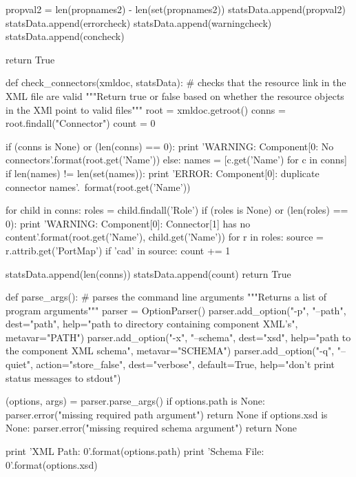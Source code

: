 \begin{MyVerbatim}
    propval2 = len(propnames2) - len(set(propnames2))
    statsData.append(propval2)
    statsData.append(errorcheck)
    statsData.append(warningcheck)
    statsData.append(concheck)

    return True


def check_connectors(xmldoc, statsData):  # checks that the resource link 
 in the XML file are valid
    """Return true or false based on whether the resource objects in the 
       XMl point to valid files"""
    root = xmldoc.getroot()
    conns = root.findall("Connector")
    count = 0

    if (conns is None) or (len(conns) == 0):
        print 'WARNING: Component[{0}: No 
         connectors'.format(root.get('Name'))
    else:
        names = [c.get('Name') for c in conns]
        if len(names) != len(set(names)):
            print 'ERROR: Component[{0}]: duplicate connector names'.\
                format(root.get('Name'))

        for child in conns:
            roles = child.findall('Role')
            if (roles is None) or (len(roles) == 0):
                print 'WARNING: Component[{0}]: Connector[{1}] has no 
                 content'.format(root.get('Name'), child.get('Name'))
            for r in roles:
                source = r.attrib.get('PortMap')
                if 'cad' in source:
                    count += 1
            
    statsData.append(len(conns))
    statsData.append(count)
    return True


def parse_args():    # parses the command line arguments
    """Returns a list of program arguments"""
    parser = OptionParser()
    parser.add_option("-p", "--path", dest="path",
                  help="path to directory containing component XML's", 
                   metavar="PATH")
    parser.add_option("-x", "--schema", dest="xsd",
                  help="path to the component XML schema", metavar="SCHEMA")
    parser.add_option("-q", "--quiet",
                  action="store_false", dest="verbose", default=True,
                  help="don't print status messages to stdout")

    (options, args) = parser.parse_args()
    if options.path is None:
        parser.error("missing required path argument")
        return None
    if options.xsd is None:
        parser.error("missing required schema argument")
        return None

    print 'XML Path: {0}'.format(options.path)
    print 'Schema File: {0}'.format(options.xsd)
    

\end{MyVerbatim}
